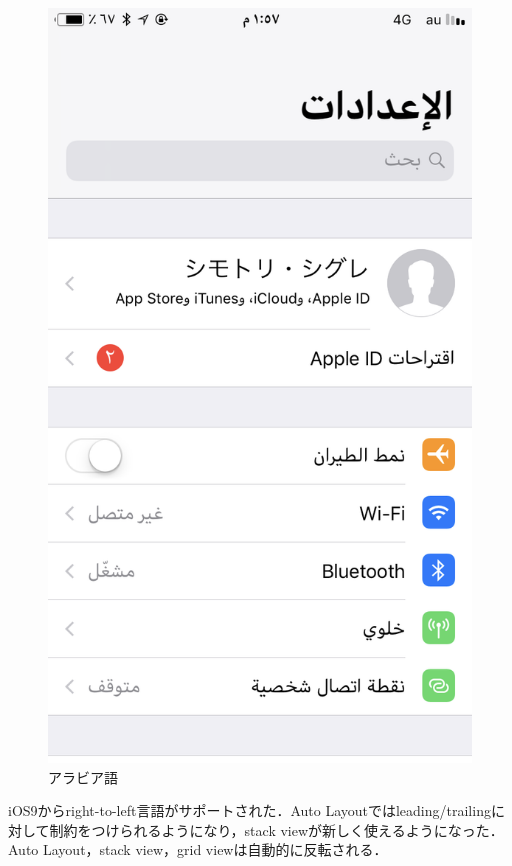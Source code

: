 \begin{figure}[htbp]
\begin{minipage}{0.5\hsize}
\begin{center}
            \includegraphics[width=\linewidth]{images/ios_preferences_rtl.png}
        \end{center}
        \caption{アラビア語}
    \end{minipage}
\end{figure}

iOS9からright-to-left言語がサポートされた．Auto Layoutではleading/trailingに対して制約をつけられるようになり，stack viewが新しく使えるようになった\cite{developer.apple.com:videos/play/wwdc2016/232/}\cite{developer.apple.com:library/archive/releasenotes/General/RN-iOSSDK-9.0/index.html}．Auto Layout，stack view，grid viewは自動的に反転される．

